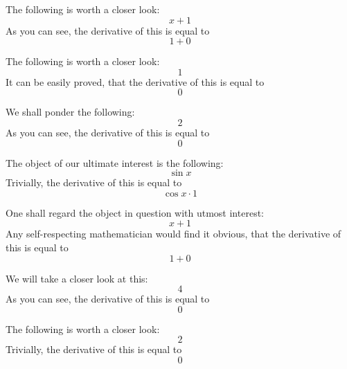 \documentclass{article}
\begin{document}
The following is worth a closer look:
\begin{equation}
x + 1 
\end{equation}
As you can see, the derivative of this is equal to
\begin{equation}
1 + 0 
\end{equation}

The following is worth a closer look:
\begin{equation}
1 
\end{equation}
It can be easily proved, that the derivative of this is equal to
\begin{equation}
0 
\end{equation}

We shall ponder the following:
\begin{equation}
2 
\end{equation}
As you can see, the derivative of this is equal to
\begin{equation}
0 
\end{equation}

The object of our ultimate interest is the following:
\begin{equation}
\sin x 
\end{equation}
Trivially, the derivative of this is equal to
\begin{equation}
\cos x \cdot 1 
\end{equation}

One shall regard the object in question with utmost interest:
\begin{equation}
x + 1 
\end{equation}
Any self-respecting mathematician would find it obvious, that the derivative of this is equal to
\begin{equation}
1 + 0 
\end{equation}

We will take a closer look at this:
\begin{equation}
4 
\end{equation}
As you can see, the derivative of this is equal to
\begin{equation}
0 
\end{equation}

The following is worth a closer look:
\begin{equation}
2 
\end{equation}
Trivially, the derivative of this is equal to
\begin{equation}
0 
\end{equation}
\end{document}
